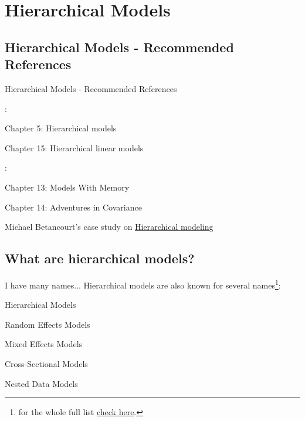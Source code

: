 
\section{Hierarchical Models}

\subsection{Hierarchical Models - Recommended References}
\begin{frame}{Hierarchical Models - Recommended References}
	\begin{vfilleditems}
		\item \textcite{gelman2013bayesian}:
		\begin{vfilleditems}
			\item Chapter 5: Hierarchical models
			\item Chapter 15: Hierarchical linear models
		\end{vfilleditems}
		\item \textcite{mcelreath2020statistical}:
		\begin{vfilleditems}
			\item Chapter 13: Models With Memory
			\item Chapter 14: Adventures in Covariance
		\end{vfilleditems}
		\item \textcite{gelmanDataAnalysisUsing2007}
		\item Michael Betancourt's case study on \href{https://betanalpha.github.io/assets/case_studies/hierarchical_modeling.html}{Hierarchical modeling}
		\item \textcite{kruschke2015bayesian}
	\end{vfilleditems}
\end{frame}

\subsection{What are hierarchical models?}
\begin{frame}{I have many names...}
	Hierarchical models are also known for several names\footnote{
		for the whole full list
		\href{https://statmodeling.stat.columbia.edu/2019/09/18/all-the-names-for-hierarchical-and-multilevel-modeling/}{check here}.}:
	\begin{vfilleditems}
		\item Hierarchical Models
		\item Random Effects Models
		\item Mixed Effects Models
		\item Cross-Sectional Models
		\item Nested Data Models
	\end{vfilleditems}
\end{frame}

